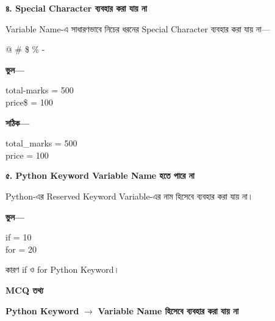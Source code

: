 \textbf{\color{darkTeal}৪. Special Character ব্যবহার করা যায় না}

Variable Name-এ সাধারণভাবে নিচের ধরনের Special Character
ব্যবহার করা যায় না—

\begin{center}

\textenglish{\ttfamily @ \quad \# \quad \$ \quad \% \quad -}

\end{center}

\textbf{ভুল—}

\begin{codebox}

\begin{english}
\ttfamily
total-marks = 500\\
price\$ = 100
\end{english}

\end{codebox}

\textbf{সঠিক—}

\begin{codebox}

\begin{english}
\ttfamily
total\_marks = 500\\
price = 100
\end{english}

\end{codebox}


\textbf{\color{darkTeal}৫. Python Keyword Variable Name হতে পারে না}

Python-এর Reserved Keyword Variable-এর নাম হিসেবে ব্যবহার
করা যায় না।

\textbf{ভুল—}

\begin{codebox}

\begin{english}
\ttfamily
if = 10\\
for = 20
\end{english}

\end{codebox}

কারণ
\textenglish{\ttfamily if}
ও
\textenglish{\ttfamily for}
Python Keyword।

\begin{rememberbox}

\textbf{\color{deepOrange}MCQ তথ্য}

\begin{center}

\textbf{Python Keyword}
\(\longrightarrow\)
\textbf{Variable Name হিসেবে ব্যবহার করা যায় না}

\end{center}

\end{rememberbox}

